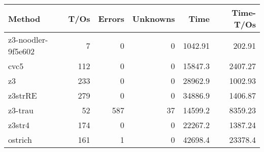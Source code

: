 \begin{tabular}{lrrrrr}
\hline
 Method             &   T/Os &   Errors &   Unknowns &     Time &   Time-T/Os \\
\hline
 z3-noodler-9f5e602 &      7 &        0 &          0 &  1042.91 &      202.91 \\
 cvc5               &    112 &        0 &          0 & 15847.3  &     2407.27 \\
 z3                 &    233 &        0 &          0 & 28962.9  &     1002.93 \\
 z3strRE            &    279 &        0 &          0 & 34886.9  &     1406.87 \\
 z3-trau            &     52 &      587 &         37 & 14599.2  &     8359.23 \\
 z3str4             &    174 &        0 &          0 & 22267.2  &     1387.24 \\
 ostrich            &    161 &        1 &          0 & 42698.4  &    23378.4  \\
\hline
\end{tabular}
